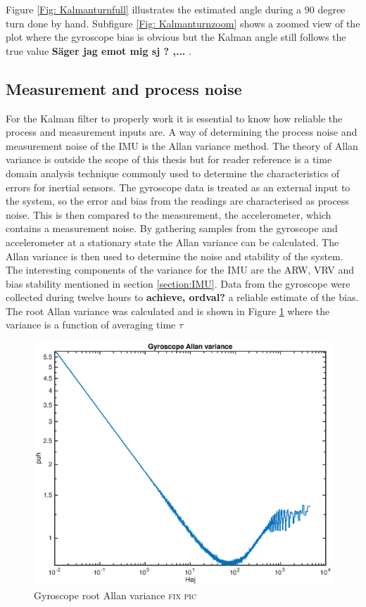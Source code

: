 \documentclass[a4paper,11pt]{kth-mag}
\begin{document}
Figure \ref{Fig: Kalmanturnfull} illustrates the estimated angle during a 90 degree turn done by hand. Subfigure \ref{Fig: Kalmanturnzoom} shows a zoomed view of the plot where the gyroscope bias is obvious but the Kalman angle still follows the true value \textbf{Säger jag emot mig sj ? ,...} .



\subsection{Measurement and process noise} \label{chapter:Allan Variance}
For the Kalman filter to properly work it is essential to know how reliable the process and measurement inputs are.  A way of determining the process noise and measurement noise of the IMU is the Allan variance method. The theory of Allan variance is outside the scope of this thesis but for reader reference is a time domain analysis technique commonly used to determine the characteristics of errors for inertial sensors\cite{Allancalibration}.
The gyroscope data is treated as an external input to the system, so the error and bias from the readings are characterised as process noise. This is then compared to the measurement, the accelerometer, which contains a measurement noise.
By gathering samples from the gyroscope and accelerometer at a stationary state the Allan variance can be calculated. The Allan variance is then used to determine the noise and stability of the system. The interesting components of the variance for the IMU are the ARW, VRV and bias stability mentioned in section \ref{section:IMU}.
Data from the gyroscope were collected during twelve hours to \textbf{achieve, ordval?} a reliable estimate of the bias. 
The root Allan variance was calculated and is shown in Figure \ref{fig:gyroscope allan} where the variance is a function of averaging time $\tau$

\begin{figure}[!htb]
\centering
\includegraphics[scale=.7]{gyroscopeallan.eps}
\caption{Gyroscope root Allan variance \textsc{fix pic}}
\label{fig:gyroscope allan}
\end{figure}
\end{document}
